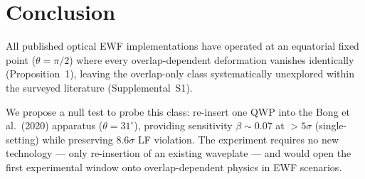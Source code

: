 \documentclass[twocolumn,aps,pra,superscriptaddress,floatfix,10pt]{revtex4-2}
\begin{document}
\section{Conclusion}
\label{sec:conclusion}

All published optical EWF implementations have operated at an equatorial
fixed point ($\theta = \pi/2$) where every overlap-dependent deformation vanishes
identically (Proposition~1), leaving the overlap-only class systematically
unexplored within the surveyed literature (Supplemental~S1).

We propose a null test to probe this class: re-insert one QWP into the
Bong et al.\ (2020) apparatus ($\theta = 31^\circ$), providing sensitivity $\beta \sim 0.07$
at ${>}5\sigma$ (single-setting) while preserving $8.6\sigma$ LF violation. The
experiment requires no new technology --- only re-insertion of an existing
waveplate --- and would open the first experimental window onto
overlap-dependent physics in EWF scenarios.
\end{document}
